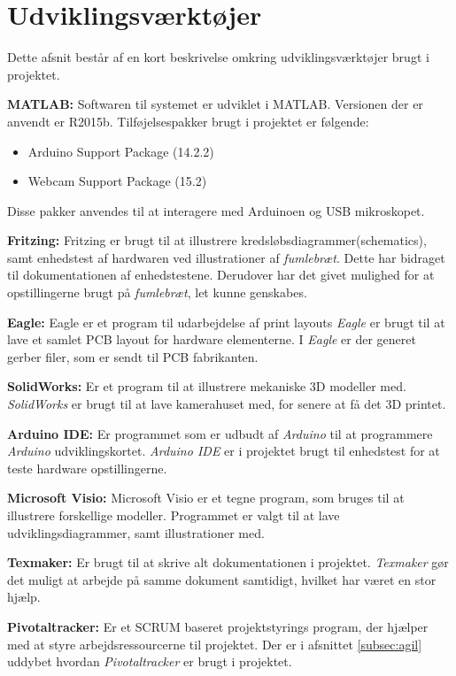 \newpage
\section{Udviklingsværktøjer}
Dette afsnit består af en kort beskrivelse omkring udviklingsværktøjer brugt i projektet.

\textbf{MATLAB:} Softwaren til systemet er udviklet i MATLAB. Versionen der er anvendt er R2015b. Tilføjelsespakker brugt i projektet er følgende:
\begin{itemize}
\item Arduino Support Package (14.2.2)
\item Webcam Support Package (15.2)
\end{itemize}
Disse pakker anvendes til at interagere med Arduinoen og USB mikroskopet. 

\textbf{Fritzing:} Fritzing er brugt til at illustrere kredsløbsdiagrammer(schematics), samt enhedstest af hardwaren ved illustrationer af \textit{fumlebræt}. Dette har bidraget til dokumentationen af  enhedstestene. Derudover har det givet mulighed for at opstillingerne brugt på \textit{fumlebræt}, let kunne genskabes.

\textbf{Eagle:} Eagle er et program til udarbejdelse af print layouts \textit{Eagle} er brugt til at lave et samlet PCB layout for hardware elementerne. I \textit{Eagle} er der generet gerber filer, som er sendt til PCB fabrikanten.

\textbf{SolidWorks:} Er et program til at illustrere mekaniske 3D modeller med.  \textit{SolidWorks} er brugt til at lave kamerahuset med, for senere at få det 3D printet.

\textbf{Arduino IDE:} Er programmet som er udbudt af \textit{Arduino} til at programmere \textit{Arduino} udviklingskortet. \textit{Arduino IDE} er i projektet brugt til enhedstest for at teste hardware opstillingerne. 

\textbf{Microsoft Visio:} Microsoft Visio er et tegne program, som bruges til at illustrere forskellige modeller. Programmet er valgt til at lave udviklingsdiagrammer, samt illustrationer med. 

\textbf{Texmaker:} Er brugt til at skrive alt dokumentationen i projektet. \textit{Texmaker} gør det muligt at arbejde på samme dokument samtidigt, hvilket har været en stor hjælp.

\textbf{Pivotaltracker:} Er et SCRUM baseret projektstyrings program, der hjælper med at styre arbejdsressourcerne til projektet. Der er i afsnittet \ref{subsec:agil} uddybet hvordan \textit{Pivotaltracker} er brugt i projektet.

